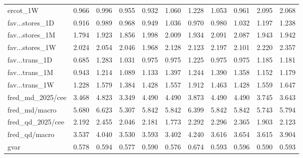 {\begin{longtable}{@{}p{2.2cm}@{\hspace{6pt}}rrrrrrrrrr@{}}
\ttfamily\scriptsize ercot\_1W & 0.966 & 0.996 & \cellcolor{medalSilver}0.955 & \cellcolor{medalGold}0.932 & 1.060 & 1.228 & 1.053 & \cellcolor{medalBronze}0.961 & 2.095 & 2.068 \\
\ttfamily\scriptsize fav...stores\_1D & \cellcolor{medalGold}0.916 & 0.989 & \cellcolor{medalBronze}0.968 & \cellcolor{medalSilver}0.949 & 1.036 & 0.970 & 0.980 & 1.032 & 1.197 & 1.238 \\
\ttfamily\scriptsize fav...stores\_1M & \cellcolor{medalGold}1.794 & \cellcolor{medalBronze}1.923 & \cellcolor{medalSilver}1.856 & 1.998 & 2.009 & 1.934 & 2.091 & 2.087 & 1.943 & 1.942 \\
\ttfamily\scriptsize fav...stores\_1W & \cellcolor{medalSilver}2.024 & 2.054 & \cellcolor{medalBronze}2.046 & \cellcolor{medalGold}1.968 & 2.128 & 2.123 & 2.197 & 2.101 & 2.220 & 2.357 \\
\ttfamily\scriptsize fav...trans\_1D & \cellcolor{medalGold}0.685 & 1.283 & 1.031 & \cellcolor{medalSilver}0.975 & \cellcolor{medalBronze}0.975 & 1.225 & 0.975 & 0.975 & 1.185 & 1.181 \\
\ttfamily\scriptsize fav...trans\_1M & \cellcolor{medalGold}0.943 & 1.214 & \cellcolor{medalSilver}1.089 & \cellcolor{medalBronze}1.133 & 1.397 & 1.244 & 1.390 & 1.358 & 1.152 & 1.179 \\
\ttfamily\scriptsize fav...trans\_1W & \cellcolor{medalGold}1.228 & 1.579 & \cellcolor{medalSilver}1.384 & \cellcolor{medalBronze}1.428 & 1.557 & 1.912 & 1.463 & 1.428 & 1.559 & 1.647 \\
\ttfamily\scriptsize fred\_md\_2025/cee & \cellcolor{medalSilver}3.468 & 4.823 & \cellcolor{medalGold}3.349 & 4.490 & 4.490 & 3.873 & 4.490 & 4.490 & 3.745 & \cellcolor{medalBronze}3.643 \\
\ttfamily\scriptsize fred\_md/macro & \cellcolor{medalSilver}5.680 & 6.623 & \cellcolor{medalGold}5.307 & 5.842 & 5.842 & 6.399 & 5.842 & 5.842 & \cellcolor{medalBronze}5.743 & 5.794 \\
\ttfamily\scriptsize fred\_qd\_2025/cee & 2.192 & 2.455 & \cellcolor{medalBronze}2.046 & 2.181 & \cellcolor{medalGold}1.773 & 2.292 & 2.296 & 2.365 & \cellcolor{medalSilver}1.903 & 2.123 \\
\ttfamily\scriptsize fred\_qd/macro & \cellcolor{medalBronze}3.537 & 4.040 & \cellcolor{medalSilver}3.530 & 3.593 & \cellcolor{medalGold}3.402 & 4.240 & 3.616 & 3.654 & 3.615 & 3.904 \\
\ttfamily\scriptsize gvar & \cellcolor{medalBronze}0.578 & 0.594 & \cellcolor{medalSilver}0.577 & 0.590 & \cellcolor{medalGold}0.576 & 0.674 & 0.593 & 0.596 & 0.590 & 0.593 \\

\end{longtable}}
